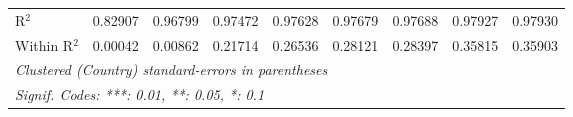 \begin{table}[htbp]
\begin{tabular}{lcccccccc}
      R$^2$                                                                 & 0.82907  & 0.96799  & 0.97472         & 0.97628         & 0.97679         & 0.97688         & 0.97927         & 0.97930\\  
      Within R$^2$                                                          & 0.00042  & 0.00862  & 0.21714         & 0.26536         & 0.28121         & 0.28397         & 0.35815         & 0.35903\\  
      \midrule \midrule
      \multicolumn{9}{l}{\emph{Clustered (Country) standard-errors in parentheses}}\\
      \multicolumn{9}{l}{\emph{Signif. Codes: ***: 0.01, **: 0.05, *: 0.1}}\\
   \end{tabular}
\end{table}


